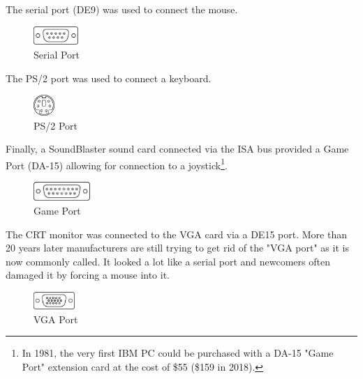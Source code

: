 \documentclass[book.tex]{subfiles}
\begin{document}
The serial port (DE9) was used to connect the mouse.
 \begin{figure}[H]
\centering
\includegraphics[width=0.15\textwidth]{imgs/drawings/ports/DE9_serial_port.eps}
\caption{Serial Port}
\label{fig:serialPort}
\end{figure}

The PS/2 port was used to connect a keyboard.
 \begin{figure}[H]
\centering
\includegraphics[width=0.07\textwidth]{imgs/drawings/ports/MiniDIN-6_PS2.eps}
\caption{PS/2 Port}
\label{fig:ps2Port}
\end{figure}


Finally, a SoundBlaster sound card connected via the ISA bus provided a Game Port (DA-15) allowing for connection to a joystick\footnote{In 1981, the very first IBM PC could be purchased with a DA-15 "Game Port" extension card at the cost of \$55 (\$159 in 2018).}.
 \begin{figure}[H]
\centering
\includegraphics[width=0.19\textwidth]{imgs/drawings/ports/DA-15_GamePort.eps}
\caption{Game Port}
\label{fig:gamePort}
\end{figure}

 The CRT monitor was connected to the VGA card via a DE15 port. More than 20 years later manufacturers are still trying to get rid of the "VGA port" as it is now commonly called. It looked a lot like a serial port and newcomers often damaged it by forcing a mouse into it.
 \begin{figure}[H]
\centering
\includegraphics[width=0.14\textwidth]{imgs/drawings/DE15_VGA.eps}
\caption{VGA Port}
\label{fig:ps2Port}
\end{figure}
\end{document}
